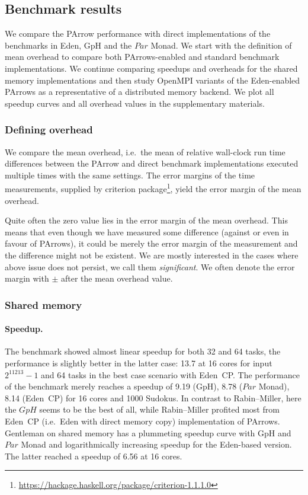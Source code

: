 \documentclass{jfp1}
\newcommand{\Conid}[1]{\mathit{#1}}
\DeclareRobustCommand{\hairspn}{\hspace{1pt}\nolinebreak}%
\DeclareRobustCommand{\ie}{{i.\hairspn{}e.~}}
\begin{document}
\subsection{Benchmark results}\label{sec:benchmarkResults}

We compare the PArrow performance with direct implementations of the benchmarks in Eden, GpH and the \ensuremath{\Conid{Par}} Monad.
We start with the definition of mean overhead to compare both PArrows-enabled and standard benchmark implementations. We continue comparing speedups and overheads for the shared memory implementations and then study OpenMPI variants of the Eden-enabled PArrows as a representative of a distributed memory backend. We plot all speedup curves and all overhead values in the supplementary materials.

\subsubsection{Defining overhead}

We compare the mean overhead, \ie the mean of relative wall-clock run time differences between the PArrow and direct benchmark implementations executed multiple times with the same settings.
The error margins of the time measurements, supplied by criterion package\footnote{\url{https://hackage.haskell.org/package/criterion-1.1.1.0}}, yield the error margin of the mean overhead. 

Quite often the zero value lies in the error margin of the mean overhead. This means that even though we have measured some difference (against or even in favour of PArrows), it could be merely the error margin of the measurement and the difference might not be existent. We are mostly interested in the cases where above issue does not persist, we call them \emph{significant}. We often denote the error margin with $\pm$ after the mean overhead value.

\subsubsection{Shared memory}

\paragraph{Speedup.}
The \rmtest benchmark showed almost linear speedup for both 32 and 64 tasks, the performance is slightly better in the latter case: 13.7 at 16 cores for input $2^{11213}-1$ and 64 tasks in the best case scenario with Eden~CP. The performance of the \sudokutest benchmark merely reaches a speedup of 9.19 (GpH), 8.78 (\ensuremath{\Conid{Par}} Monad), 8.14 (Eden~CP) for 16 cores and 1000 Sudokus. In contrast to Rabin--Miller, here the \ensuremath{\Conid{GpH}} seems to be the best of all, while Rabin--Miller profited most from Eden~CP (\ie Eden with direct memory copy) implementation of PArrows. Gentleman on shared memory has a plummeting speedup curve with GpH and \ensuremath{\Conid{Par}} Monad and logarithmically increasing speedup for the Eden-based version. The latter reached a speedup of 6.56 at 16 cores.
\end{document}
